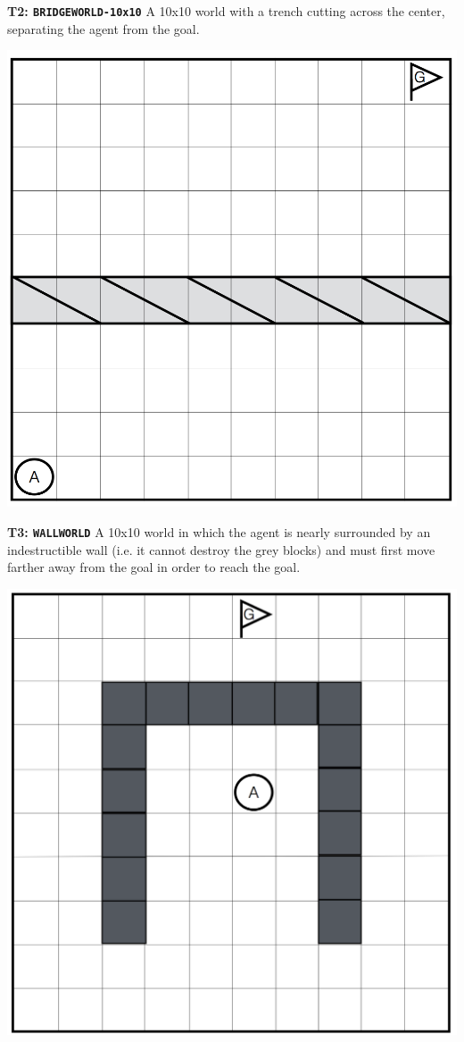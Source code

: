 \documentclass[]{article}
\begin{document}
{\bf T2: \texttt{BRIDGEWORLD-10x10}} A 10x10 world with a trench cutting across the center, separating the agent from the goal.

\begin{center}
\includegraphics[scale=0.28]{figures/bridgeworld10.png}
\end{center}

{\bf T3: \texttt{WALLWORLD}}
A 10x10 world in which the agent is nearly surrounded by an indestructible wall (i.e. it cannot destroy the grey blocks) and must first move farther away from the goal in order to reach the goal.

\begin{center}
\includegraphics[scale=0.21]{figures/uwall.png}
\end{center}
\end{document}
